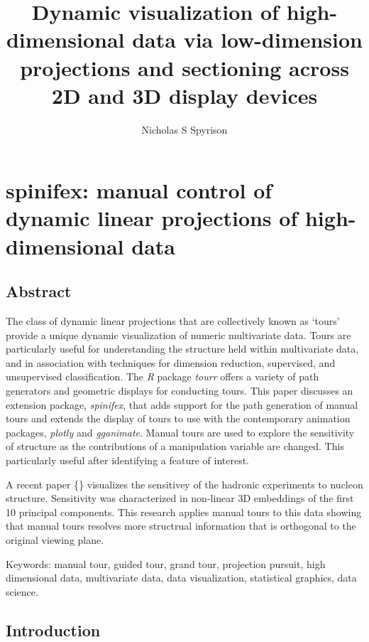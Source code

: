 \documentclass{monashthesis}
\author{Nicholas S Spyrison}
\title{Dynamic visualization of high-dimensional data via low-dimension projections and sectioning across 2D and 3D display devices}
\begin{document}

\titlepage

{\sf\tighttoc\doublespacing}

\hypertarget{spinifex-manual-control-of-dynamic-linear-projections-of-high-dimensional-data}{%
\chapter{spinifex: manual control of dynamic linear projections of high-dimensional data}\label{spinifex-manual-control-of-dynamic-linear-projections-of-high-dimensional-data}}

\hypertarget{abstract}{%
\section{Abstract}\label{abstract}}

The class of dynamic linear projections that are collectively known as `tours' provide a unique dynamic visualization of numeric multivariate data. Tours are particularly useful for understanding the structure held within multivariate data, and in association with techniques for dimension reduction, supervised, and unsupervised classification. The \emph{R} package \emph{tourr} offers a variety of path generators and geometric displays for conducting tours. This paper discusses an extension package, \emph{spinifex}, that adds support for the path generation of manual tours and extends the display of tours to use with the contemporary animation packages, \emph{plotly} and \emph{gganimate}. Manual tours are used to explore the sensitivity of structure as the contributions of a manipulation variable are changed. This particularly useful after identifying a feature of interest.

A recent paper \{\textcite{wang_mapping_2018}\} visualizes the sensitivey of the hadronic experiments to nucleon structure. Sensitivity was characterized in non-linear 3D embeddings of the first 10 principal components. This research applies manual tours to this data showing that manual tours resolves more structrual information that is orthogonal to the original viewing plane.

Keywords: manual tour, guided tour, grand tour, projection pursuit, high dimensional data, multivariate data, data visualization, statistical graphics, data science.

\hypertarget{introduction}{%
\section{Introduction}\label{introduction}}
\end{document}
